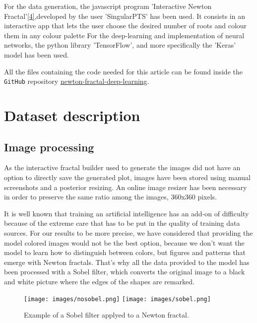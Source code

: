 \documentclass{article}
\begin{document}
\noindent For the data generation, the javascript program 'Interactive Newton Fractal'\hyperref[id4]{[4]},developed by the user 'SingularPTS' has been used. It consists in an interactive app that lets the user choose the desired number of roots and colour them in any colour palette
For the deep-learning and implementation of neural networks, the python library 'TensorFlow', and more specifically the 'Keras' model has been used.

\noindent All the files containing the code needed for this article can be found inside the \texttt{GitHub} repository \href{https://github.com/Mnietoprez/newton-fractal-deep-learning}{newton-fractal-deep-learning}.

\section{Dataset description}
\subsection{Image processing}
As the interactive fractal builder used to generate the images did not have an option to directly save the generated plot, images have been stored using manual screenshots and a posterior resizing. An online image resizer has been necessary in order to preserve the same ratio among the images, 360x360 pixels.

\vspace{10}
\noindent It is well known that training an artificial intelligence has an add-on of difficulty because of the extreme care that has to be put in the quality of training data sources. For our results to be more precise, we have considered that providing the model colored images would not be the best option, because we don't want the model to learn how to distinguish between colors, but figures and patterns that emerge with Newton fractals. That's why all the data provided to the model has been processed with a Sobel filter, which converts the original image to a black and white picture where the edges of the shapes are remarked.

\begin{figure}[h!]
\centering
\texttt{[image: images/nosobel.png]}
\hspace{6}
\texttt{[image: images/sobel.png]}
\centering
\caption{Example of a Sobel filter applyed to a Newton fractal.}
\label{exnewton}
\end{figure}
\end{document}
